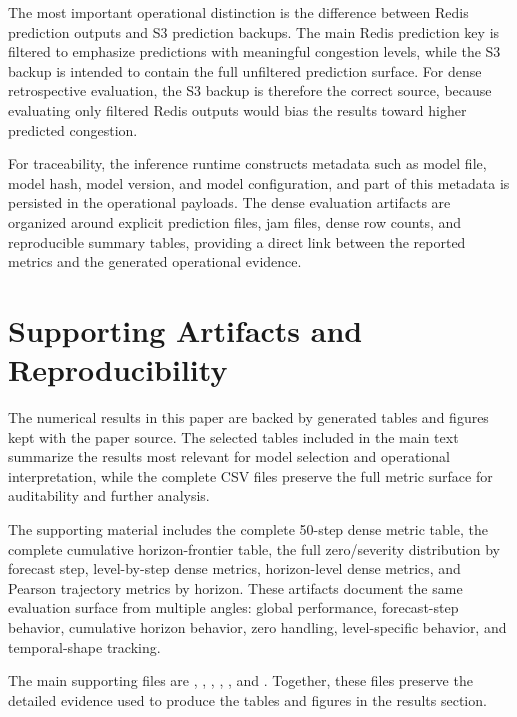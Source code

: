 \documentclass[11pt, a4paper]{article}
\begin{document}
The most important operational distinction is the difference between Redis prediction outputs and S3 prediction backups. The main Redis prediction key is filtered to emphasize predictions with meaningful congestion levels, while the S3 backup is intended to contain the full unfiltered prediction surface. For dense retrospective evaluation, the S3 backup is therefore the correct source, because evaluating only filtered Redis outputs would bias the results toward higher predicted congestion.

For traceability, the inference runtime constructs metadata such as model file, model hash, model version, and model configuration, and part of this metadata is persisted in the operational payloads. The dense evaluation artifacts are organized around explicit prediction files, jam files, dense row counts, and reproducible summary tables, providing a direct link between the reported metrics and the generated operational evidence.

\section{Supporting Artifacts and Reproducibility}

The numerical results in this paper are backed by generated tables and figures kept with the paper source. The selected tables included in the main text summarize the results most relevant for model selection and operational interpretation, while the complete CSV files preserve the full metric surface for auditability and further analysis.

The supporting material includes the complete 50-step dense metric table, the complete cumulative horizon-frontier table, the full zero/severity distribution by forecast step, level-by-step dense metrics, horizon-level dense metrics, and Pearson trajectory metrics by horizon. These artifacts document the same evaluation surface from multiple angles: global performance, forecast-step behavior, cumulative horizon behavior, zero handling, level-specific behavior, and temporal-shape tracking.

The main supporting files are , , , , , and . Together, these files preserve the detailed evidence used to produce the tables and figures in the results section.
\end{document}
